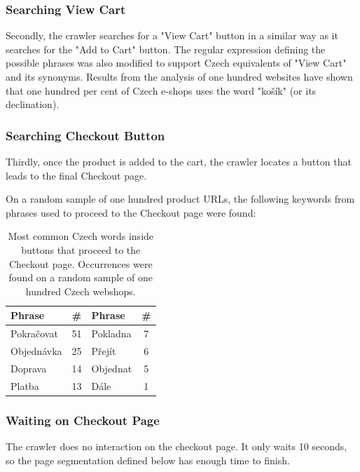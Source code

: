         \subsubsection{Searching View Cart}
            Secondly, the crawler searches for a "View Cart" button in a similar way as it searches for the "Add to Cart" button. The regular expression defining the possible phrases was also modified to support Czech equivalents of "View Cart" and its synonyms. Results from the analysis of one hundred websites have shown that one hundred per cent of Czech e-shops uses the word "košík" (or its declination).


        \subsubsection{Searching Checkout Button}
            Thirdly, once the product is added to the cart, the crawler locates a button that leads to the final Checkout page.

            On a random sample of one hundred product URLs, the following keywords from phrases used to proceed to the Checkout page were found:

            \begin{table}[h!]
                \centering
                \bgroup
                \def\arraystretch{1.65}
                \begin{tabular}{l | c | l | c} 
                    \toprule
                    \textbf{Phrase} & \textbf{\#} & \textbf{Phrase} & \textbf{\#} \\ \hline
                    Pokračovat & 51 & Pokladna & 7  \\ \hline
                    Objednávka & 25 & Přejít & 6 \\ \hline
                    Doprava & 14 & Objednat & 5 \\ \hline
                    Platba & 13 & Dále & 1 \\ \hline
                \end{tabular}
                \egroup
                \caption{Most common Czech words inside buttons that proceed to the Checkout page. Occurrences were found on a random sample of one hundred Czech webshops.}
                \label{table:add-to-cart-phrases}
            \end{table}

        \subsubsection{Waiting on Checkout Page}
            The crawler does no interaction on the checkout page. It only waits 10 seconds, so the page segmentation defined below has enough time to finish.

